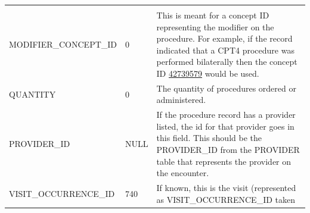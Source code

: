 \documentclass[]{book}
\begin{document}
\begin{longtable}[]{@{}lll@{}}
\begin{minipage}[t]{0.47\columnwidth}
\end{minipage}\tabularnewline
\begin{minipage}[t]{0.30\columnwidth}\raggedright\strut
MODIFIER\_CONCEPT\_ID\strut
\end{minipage} & \begin{minipage}[t]{0.14\columnwidth}\raggedright\strut
0\strut
\end{minipage} & \begin{minipage}[t]{0.47\columnwidth}\raggedright\strut
This is meant for a concept ID representing the modifier on the
procedure. For example, if the record indicated that a CPT4 procedure
was performed bilaterally then the concept ID
\href{http://athena.ohdsi.org/search-terms/terms/42739579}{42739579}
would be used.\strut
\end{minipage}\tabularnewline
\begin{minipage}[t]{0.30\columnwidth}\raggedright\strut
QUANTITY\strut
\end{minipage} & \begin{minipage}[t]{0.14\columnwidth}\raggedright\strut
0\strut
\end{minipage} & \begin{minipage}[t]{0.47\columnwidth}\raggedright\strut
The quantity of procedures ordered or administered.\strut
\end{minipage}\tabularnewline
\begin{minipage}[t]{0.30\columnwidth}\raggedright\strut
PROVIDER\_ID\strut
\end{minipage} & \begin{minipage}[t]{0.14\columnwidth}\raggedright\strut
NULL\strut
\end{minipage} & \begin{minipage}[t]{0.47\columnwidth}\raggedright\strut
If the procedure record has a provider listed, the id for that provider
goes in this field. This should be the PROVIDER\_ID from the PROVIDER
table that represents the provider on the encounter.\strut
\end{minipage}\tabularnewline
\begin{minipage}[t]{0.30\columnwidth}\raggedright\strut
VISIT\_OCCURRENCE\_ID\strut
\end{minipage} & \begin{minipage}[t]{0.14\columnwidth}\raggedright\strut
740\strut
\end{minipage} & \begin{minipage}[t]{0.47\columnwidth}\raggedright\strut
If known, this is the visit (represented as VISIT\_OCCURRENCE\_ID taken

\end{minipage}
\end{longtable}
\end{document}
